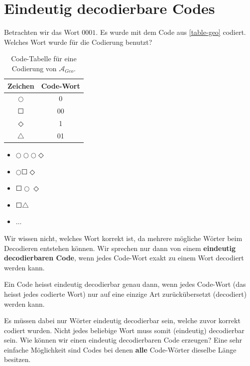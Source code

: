 \section{Eindeutig decodierbare Codes}

Betrachten wir das Wort $0001$. Es wurde mit dem Code aus \autoref{table-geo} codiert. Welches Wort wurde für die Codierung benutzt? 

\begin{table}[htb]
\centering
\begin{minipage}{0.6\textwidth}
\centering
\begin{tabular}{|c|c|}
\hline
Zeichen & Code-Wort \\ \hline
 $\Circle$       & 0         \\ \hline
 $\Square$       & 00        \\ \hline
 $\Diamond$       & 1         \\ \hline
 $\triangle$       & 01        \\ \hline
\end{tabular}
\caption{Code-Tabelle für eine Codierung von $\mathscr{A}_{Geo}$.}
\label{table-geo}
\end{minipage}
\hfill
\begin{minipage}{0.3\textwidth}
\centering
\begin{itemize}
\item $\Circle\Circle\Circle\Diamond$
\item $\Circle\Square\Diamond$
\item $\Square\Circle\Diamond$
\item $\Square\triangle$
\item $\dots$
\end{itemize}
\end{minipage}
\end{table}

Wir wissen nicht, welches Wort korrekt ist, da mehrere mögliche Wörter beim Decodieren entstehen können. Wir sprechen nur dann von einem \textbf{eindeutig decodierbaren Code}, wenn jedes Code-Wort exakt zu einem Wort decodiert werden kann.

\begin{definition}
Ein Code heisst eindeutig decodierbar genau dann, wenn jedes Code-Wort (das heisst jedes codierte Wort) nur auf eine einzige Art zurückübersetzt (decodiert) werden kann.
\end{definition}

Es müssen dabei nur Wörter eindeutig decodierbar sein, welche zuvor korrekt codiert wurden. Nicht jedes beliebige Wort muss somit (eindeutig) decodierbar sein. Wie können wir einen eindeutig decodierbaren Code erzeugen? Eine sehr einfache Möglichkeit sind Codes bei denen \textbf{alle} Code-Wörter dieselbe Länge besitzen.

